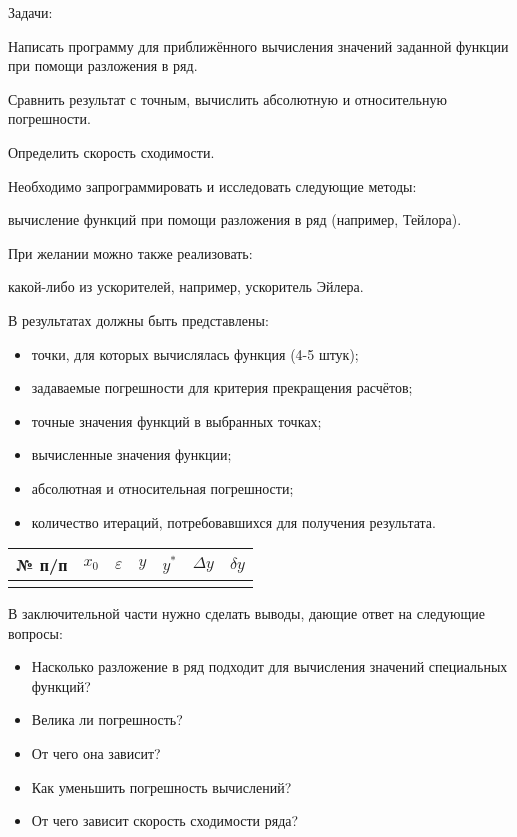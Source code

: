 \Tasks

Задачи:

Написать программу для приближённого вычисления значений заданной
функции при помощи разложения в ряд.

Сравнить результат с точным, вычислить абсолютную и относительную
погрешности.

Определить скорость сходимости.

Необходимо запрограммировать и исследовать следующие методы:

вычисление функций при помощи разложения в ряд (например, Тейлора).

При желании можно также реализовать:

какой-либо из ускорителей, например, ускоритель Эйлера.

В результатах должны быть представлены:
\begin{itemize}
\item точки, для которых вычислялась функция (4-5 штук);
\item задаваемые погрешности для критерия прекращения расчётов;
\item точные значения функций в выбранных точках;
\item вычисленные значения функции;
\item абсолютная и относительная погрешности;
\item количество итераций, потребовавшихся для получения результата.
\end{itemize}

\begin{center}
  \begin{tabular}{|c|c|c|c|c|c|c|}
    \hline 
    № п/п & $x_{0}$ & $\varepsilon$ & $y$ & $y^{*}$ & $\Delta y$ & $\delta y$\tabularnewline
    \hline 
    \hline 
    &  &  &  &  &  & \tabularnewline
    \hline 
  \end{tabular}
  \par
\end{center}
  
В заключительной части нужно сделать выводы, дающие ответ на следующие
вопросы:
\begin{itemize}
\item Насколько разложение в ряд подходит для вычисления значений
  специальных функций?
\item Велика ли погрешность?
\item От чего она зависит?
\item Как уменьшить погрешность вычислений?
\item От чего зависит скорость сходимости ряда? 
\end{itemize}

